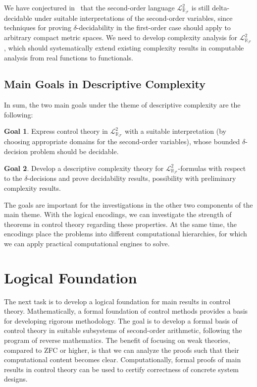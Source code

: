 \documentclass[11pt]{article}
\newcommand{\lrf}{\mathcal{L}_{\mathbb{R}_{\mathcal{F}}}}
\theoremstyle{definition}
\newtheorem{goal}{Goal}
\begin{document}
We have conjectured in~\cite{DBLP:conf/lics/GaoAC12} that the second-order language $\lrf^2$ is still delta-decidable under suitable interpretations of the second-order variables, since techniques for proving $\delta$-decidability in the first-order case should apply to arbitrary compact metric spaces. We need to develop complexity analysis for $\lrf^2$, which should systematically extend existing complexity results in computable analysis from real functions to functionals. 

\subsection{Main Goals in Descriptive Complexity} 
In sum, the two main goals under the theme of descriptive complexity are the following:
\begin{goal}
Express control theory in $\mathcal{L}^2_{\mathbb{R}_{\mathcal{F}}}$ with a suitable interpretation (by choosing appropriate domains for the second-order variables), whose bounded $\delta$-decision problem should be decidable.
\end{goal}
\begin{goal}
Develop a descriptive complexity theory for $\lrf^2$-formulas with respect to the $\delta$-decisions and prove decidability results, possibility with preliminary complexity results. 
\end{goal}
The goals are important for the investigations in the other two components of the main theme. With the logical encodings, we can investigate the strength of theorems in control theory regarding these properties. At the same time, the encodings place the problems into different computational hierarchies, for which we can apply practical computational engines to solve. 

\section{Logical Foundation}\label{lf}

The next task is to develop a logical foundation for main results in control theory. Mathematically, a formal foundation of control methods provides a basis for developing rigorous methodology. The goal is to develop a formal basis of control theory in suitable subsystems of second-order arithmetic, following the program of reverse mathematics. The benefit of focusing on weak theories, compared to ZFC or higher, is that we can analyze the proofs such that their computational content becomes clear. Computationally, formal proofs of main results in control theory can be used to certify correctness of  concrete system designs. 
\end{document}
